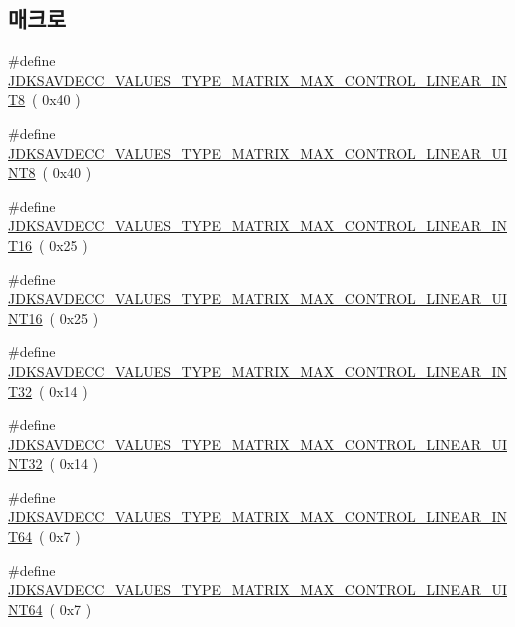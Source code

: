 \subsection*{매크로}
\begin{DoxyCompactItemize}
\item 
\#define \hyperlink{group__values__type__matrix__max_gad9335f357f3864c20d202a6db60bfd04}{J\+D\+K\+S\+A\+V\+D\+E\+C\+C\+\_\+\+V\+A\+L\+U\+E\+S\+\_\+\+T\+Y\+P\+E\+\_\+\+M\+A\+T\+R\+I\+X\+\_\+\+M\+A\+X\+\_\+\+C\+O\+N\+T\+R\+O\+L\+\_\+\+L\+I\+N\+E\+A\+R\+\_\+\+I\+N\+T8}~( 0x40 )
\item 
\#define \hyperlink{group__values__type__matrix__max_gadac5f01b8c686a03120d78aa2a857d3f}{J\+D\+K\+S\+A\+V\+D\+E\+C\+C\+\_\+\+V\+A\+L\+U\+E\+S\+\_\+\+T\+Y\+P\+E\+\_\+\+M\+A\+T\+R\+I\+X\+\_\+\+M\+A\+X\+\_\+\+C\+O\+N\+T\+R\+O\+L\+\_\+\+L\+I\+N\+E\+A\+R\+\_\+\+U\+I\+N\+T8}~( 0x40 )
\item 
\#define \hyperlink{group__values__type__matrix__max_ga8eed547b7b30be9bc68d6f762a1e69f6}{J\+D\+K\+S\+A\+V\+D\+E\+C\+C\+\_\+\+V\+A\+L\+U\+E\+S\+\_\+\+T\+Y\+P\+E\+\_\+\+M\+A\+T\+R\+I\+X\+\_\+\+M\+A\+X\+\_\+\+C\+O\+N\+T\+R\+O\+L\+\_\+\+L\+I\+N\+E\+A\+R\+\_\+\+I\+N\+T16}~( 0x25 )
\item 
\#define \hyperlink{group__values__type__matrix__max_ga71ea39caa0301c93ac8d2712a485e20c}{J\+D\+K\+S\+A\+V\+D\+E\+C\+C\+\_\+\+V\+A\+L\+U\+E\+S\+\_\+\+T\+Y\+P\+E\+\_\+\+M\+A\+T\+R\+I\+X\+\_\+\+M\+A\+X\+\_\+\+C\+O\+N\+T\+R\+O\+L\+\_\+\+L\+I\+N\+E\+A\+R\+\_\+\+U\+I\+N\+T16}~( 0x25 )
\item 
\#define \hyperlink{group__values__type__matrix__max_gaf7a8a376859e69ef2071cda1bb42f835}{J\+D\+K\+S\+A\+V\+D\+E\+C\+C\+\_\+\+V\+A\+L\+U\+E\+S\+\_\+\+T\+Y\+P\+E\+\_\+\+M\+A\+T\+R\+I\+X\+\_\+\+M\+A\+X\+\_\+\+C\+O\+N\+T\+R\+O\+L\+\_\+\+L\+I\+N\+E\+A\+R\+\_\+\+I\+N\+T32}~( 0x14 )
\item 
\#define \hyperlink{group__values__type__matrix__max_gae27ad976c3f3596432ef29e0aedfd705}{J\+D\+K\+S\+A\+V\+D\+E\+C\+C\+\_\+\+V\+A\+L\+U\+E\+S\+\_\+\+T\+Y\+P\+E\+\_\+\+M\+A\+T\+R\+I\+X\+\_\+\+M\+A\+X\+\_\+\+C\+O\+N\+T\+R\+O\+L\+\_\+\+L\+I\+N\+E\+A\+R\+\_\+\+U\+I\+N\+T32}~( 0x14 )
\item 
\#define \hyperlink{group__values__type__matrix__max_gaf6597a26de48fcbc06a13472b86c0b4e}{J\+D\+K\+S\+A\+V\+D\+E\+C\+C\+\_\+\+V\+A\+L\+U\+E\+S\+\_\+\+T\+Y\+P\+E\+\_\+\+M\+A\+T\+R\+I\+X\+\_\+\+M\+A\+X\+\_\+\+C\+O\+N\+T\+R\+O\+L\+\_\+\+L\+I\+N\+E\+A\+R\+\_\+\+I\+N\+T64}~( 0x7 )
\item 
\#define \hyperlink{group__values__type__matrix__max_ga1521bea30b5d8e2d0e269bcc1f9382bc}{J\+D\+K\+S\+A\+V\+D\+E\+C\+C\+\_\+\+V\+A\+L\+U\+E\+S\+\_\+\+T\+Y\+P\+E\+\_\+\+M\+A\+T\+R\+I\+X\+\_\+\+M\+A\+X\+\_\+\+C\+O\+N\+T\+R\+O\+L\+\_\+\+L\+I\+N\+E\+A\+R\+\_\+\+U\+I\+N\+T64}~( 0x7 )

\end{DoxyCompactItemize}
